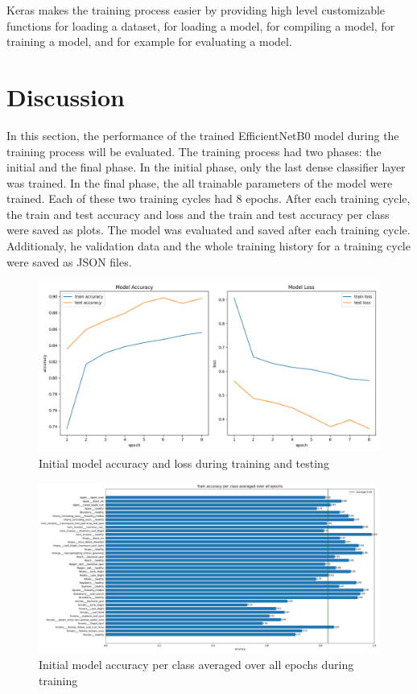 \documentclass{BachelorBUI}
\begin{document}
        Keras makes the training process easier by providing high level customizable functions for loading a dataset, for loading a model, for compiling a model, for training a model, and for example for evaluating a model.

\section{Discussion}

    In this section, the performance of the trained EfficientNetB0 model during the training process will be evaluated. The training process had two phases: the initial and the final phase. In the initial phase, only the last dense classifier layer was trained. In the final phase, the all trainable parameters of the model were trained. Each of these two training cycles had 8 epochs. After each training cycle, the train and test accuracy and loss and the train and test accuracy per class were saved as plots. The model was evaluated and saved after each training cycle. Additionaly, he validation data and the whole training history for a training cycle were saved as JSON files.
        \begin{figure}[h]
            \centering
            \includegraphics[width=\textwidth]{initial_accuracy_and_loss_2024-11-25_07.55.35.png}
            \caption{\centering Initial model accuracy and loss during training and testing}
            \label{fig:initial-accuracy-and-loss}
        \end{figure}
        \begin{figure}[h]
            \centering
            \includegraphics[width=\textwidth]{initial_train_accuracy_per_class_2024-11-25_07.55.35.png}
            \caption{\centering Initial model accuracy per class averaged over all epochs during training}
            \label{fig:initial-train-accuracy-per-class}
        \end{figure}
\end{document}
